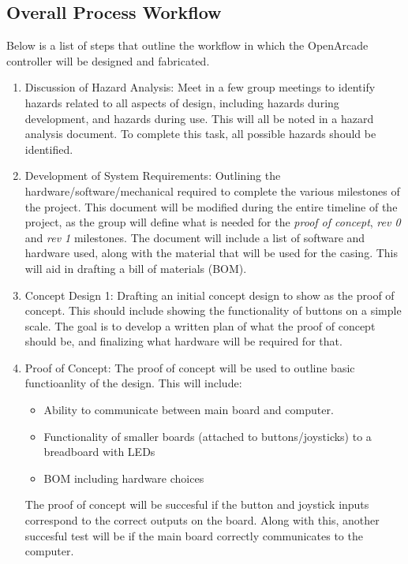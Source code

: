 \documentclass[a4]{article}
\begin{document}
\subsection{Overall Process Workflow}
Below is a list of steps that outline the workflow in which the OpenArcade controller will be designed and fabricated.
\begin{enumerate}
    \item \textcolor{McMasterMaroon}{Discussion of Hazard Analysis}: Meet in a few group meetings to identify hazards related to all aspects of design, including hazards during development, and hazards during use. This will all be noted in a hazard analysis document. To complete this task, all possible hazards should be identified.
    \item \textcolor{McMasterMaroon}{Development of System Requirements}: Outlining the hardware/software/mechanical required to complete the various milestones of the project. This document will be modified during the entire timeline of the project, as the group will define what is needed for the \textit{proof of concept}, \textit{rev 0} and \textit{rev 1} milestones. The document will include a list of software and hardware used, along with the material that will be used for the casing. This will aid in drafting a bill of materials (BOM).
    \item \textcolor{McMasterMaroon}{Concept Design 1}: Drafting an initial concept design to show as the proof of concept. This should include showing the functionality of buttons on a simple scale. The goal is to develop a written plan of what the proof of concept should be, and finalizing what hardware will be required for that.
    \item \textcolor{McMasterMaroon}{Proof of Concept}: The proof of concept will be used to outline basic functioanlity of the design. This will include:
        \begin{itemize}
            \item Ability to communicate between main board and computer.
            \item Functionality of smaller boards (attached to buttons/joysticks) to a breadboard with LEDs
            \item BOM including hardware choices
        \end{itemize}
    The proof of concept will be succesful if the button and joystick inputs correspond to the correct outputs on the board. Along with this, another succesful test will be if the main board correctly communicates to the computer.

\end{enumerate}
\end{document}
